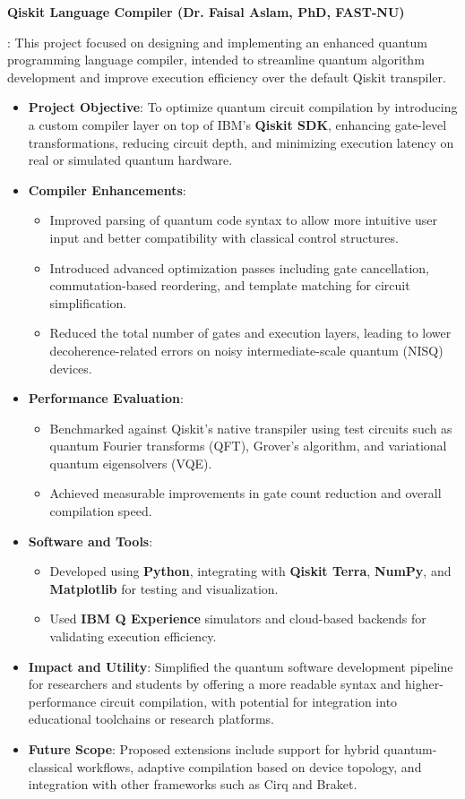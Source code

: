 \documentclass[letterpaper,10pt]{article}
\newcommand{\resumeItem}[2]{
  \item\small{
    \textbf{#1}{: #2 \vspace{-2pt}}
  }
}
\newcommand{\resumeSubItem}[2]{\resumeItem{#1}{#2}\vspace{-4pt}}
\begin{document}
\resumeSubItem{Qiskit Language Compiler (Dr. Faisal Aslam, PhD, FAST-NU)}
{This project focused on designing and implementing an enhanced quantum programming language compiler, intended to streamline quantum algorithm development and improve execution efficiency over the default Qiskit transpiler.
\begin{itemize}
    \item \textbf{Project Objective}: To optimize quantum circuit compilation by introducing a custom compiler layer on top of IBM’s \textbf{Qiskit SDK}, enhancing gate-level transformations, reducing circuit depth, and minimizing execution latency on real or simulated quantum hardware.
    \item \textbf{Compiler Enhancements}:
    \begin{itemize}
        \item Improved parsing of quantum code syntax to allow more intuitive user input and better compatibility with classical control structures.
        \item Introduced advanced optimization passes including gate cancellation, commutation-based reordering, and template matching for circuit simplification.
        \item Reduced the total number of gates and execution layers, leading to lower decoherence-related errors on noisy intermediate-scale quantum (NISQ) devices.
    \end{itemize}
    \item \textbf{Performance Evaluation}:
    \begin{itemize}
        \item Benchmarked against Qiskit’s native transpiler using test circuits such as quantum Fourier transforms (QFT), Grover’s algorithm, and variational quantum eigensolvers (VQE).
        \item Achieved measurable improvements in gate count reduction and overall compilation speed.
    \end{itemize}
    \item \textbf{Software and Tools}:
    \begin{itemize}
        \item Developed using \textbf{Python}, integrating with \textbf{Qiskit Terra}, \textbf{NumPy}, and \textbf{Matplotlib} for testing and visualization.
        \item Used \textbf{IBM Q Experience} simulators and cloud-based backends for validating execution efficiency.
    \end{itemize}
    \item \textbf{Impact and Utility}: Simplified the quantum software development pipeline for researchers and students by offering a more readable syntax and higher-performance circuit compilation, with potential for integration into educational toolchains or research platforms.
    \item \textbf{Future Scope}: Proposed extensions include support for hybrid quantum-classical workflows, adaptive compilation based on device topology, and integration with other frameworks such as Cirq and Braket.
\end{itemize}
}
\end{document}

